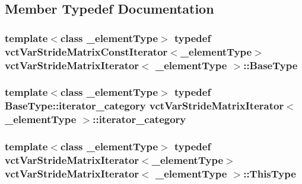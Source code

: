 \subsection{Member Typedef Documentation}
\hypertarget{classvct_var_stride_matrix_iterator_adfcc105f210fef52621dd5ea9fe8b937}{
\subsubsection[{Base\-Type}]{\setlength{\rightskip}{0pt plus 5cm}template$<$class \-\_\-element\-Type$>$ typedef {\bf vct\-Var\-Stride\-Matrix\-Const\-Iterator}$<$\-\_\-element\-Type$>$ {\bf vct\-Var\-Stride\-Matrix\-Iterator}$<$ \-\_\-element\-Type $>$\-::{\bf Base\-Type}}}\label{classvct_var_stride_matrix_iterator_adfcc105f210fef52621dd5ea9fe8b937}
\hypertarget{classvct_var_stride_matrix_iterator_a4666721e510380bfb3c0947d8d37eab9}{
\subsubsection[{iterator\-\_\-category}]{\setlength{\rightskip}{0pt plus 5cm}template$<$class \-\_\-element\-Type$>$ typedef Base\-Type\-::iterator\-\_\-category {\bf vct\-Var\-Stride\-Matrix\-Iterator}$<$ \-\_\-element\-Type $>$\-::{\bf iterator\-\_\-category}}}\label{classvct_var_stride_matrix_iterator_a4666721e510380bfb3c0947d8d37eab9}
\hypertarget{classvct_var_stride_matrix_iterator_a70b8fef02244dad380a0836d86afdd3e}{
\subsubsection[{This\-Type}]{\setlength{\rightskip}{0pt plus 5cm}template$<$class \-\_\-element\-Type$>$ typedef {\bf vct\-Var\-Stride\-Matrix\-Iterator}$<$\-\_\-element\-Type$>$ {\bf vct\-Var\-Stride\-Matrix\-Iterator}$<$ \-\_\-element\-Type $>$\-::{\bf This\-Type}}}\label{classvct_var_stride_matrix_iterator_a70b8fef02244dad380a0836d86afdd3e}


